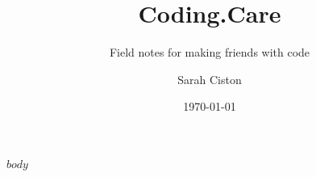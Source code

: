 \documentclass[9pt,oneside]{scrartcl}
\title{Coding.Care}
\subtitle{Field notes for making friends with code}
\author{Sarah Ciston}
\date{\today}
\begin{document}
\maketitle

\newpage


\renewcommand*\contentsname{Table of Contents}
\tableofcontents

\newpage

$body$
\end{document}
